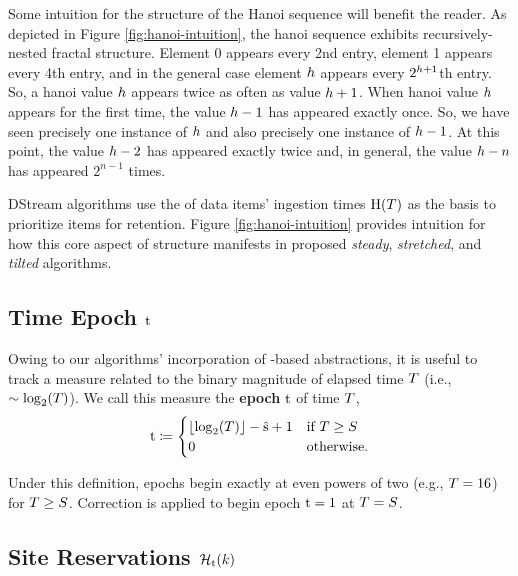Some intuition for the structure of the Hanoi sequence will benefit the reader.
As depicted in Figure \ref{fig:hanoi-intuition}, the hanoi sequence exhibits recursively-nested fractal structure.
Element 0 appears every 2nd entry, element 1 appears every 4th entry, and in the general case element $\colorh$ appears every $2^{\colorh+1}$th entry.
So, a hanoi value $\colorh$ appears twice as often as value $\colorh + 1$.
When hanoi value $\colorh$ appears for the first time, the value $\colorh - 1$ has appeared exactly once.
So, we have seen precisely one instance of $\colorh$ and also precisely one instance of $\colorh - 1$.
At this point, the value $\colorh - 2$ has appeared exactly twice and, in general, the value $\colorh - n$ has appeared $2^{n - 1}$ times.

DStream algorithms use the \hv{} of data items' ingestion times $\colorH(\colorT)$ as the basis to prioritize items for retention.
Figure \ref{fig:hanoi-intuition} provides intuition for how this core aspect of structure manifests in proposed \textit{steady}, \textit{stretched}, and \textit{tilted} algorithms.



\subsection{Time Epoch $\colort$}
\label{sec:notation-epoch}

Owing to our algorithms' incorporation of \hv{}-based abstractions, it is useful to track a measure related to the binary magnitude of elapsed time $\colorT$ (i.e., $\sim \log_2(\colorT)$).
We call this measure the \textbf{epoch} $\colort$ of time $\colorT$,
\begin{equation}
\colort
\coloneq
\begin{cases}
\left\lfloor \log_2(\colorT) \right\rfloor - \colors + 1 & \text{if $\colorT \geq \colorS$} \\
0 & \text{otherwise.}
\end{cases}
\label{eqn:epoch-defn}
\end{equation}

Under this definition, epochs begin exactly at even powers of two (e.g., $\colorT = 16$) for $\colorT \geq \colorS$.
Correction is applied to begin epoch $\colort=1$ at $\colorT = \colorS$.

\subsection{Site Reservations $\colorHcal_{\colort}(\colork)$}
\label{sec:notation-reservation}

